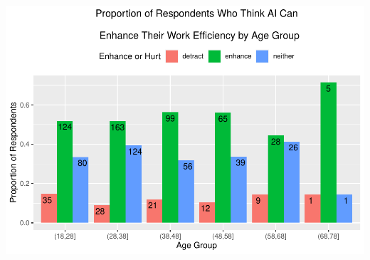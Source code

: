 \documentclass[
]{article}
\begin{document}
\includegraphics{analysis_files/figure-latex/enhancehurt-vs-age-1.pdf}
\end{document}
